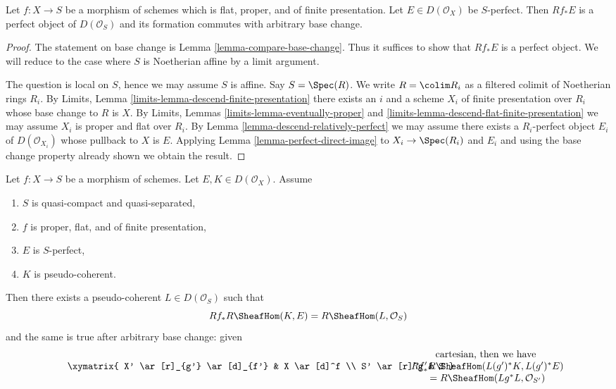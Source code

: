 \begin{lemma}
\label{lemma-derived-pushforward-rel-perfect}
Let $f : X \to S$ be a morphism of schemes which is flat, proper, and
of finite presentation. Let $E \in D(\mathcal{O}_X)$ be $S$-perfect.
Then $Rf_*E$ is a perfect object of $D(\mathcal{O}_S)$
and its formation commutes with arbitrary base change.
\end{lemma}

\begin{proof}
The statement on base change is Lemma \ref{lemma-compare-base-change}.
Thus it suffices to show that $Rf_*E$ is a perfect object. We will reduce
to the case where $S$ is Noetherian affine by a limit argument.

\medskip\noindent
The question is local on $S$, hence we may assume $S$ is affine.
Say $S = \Spec(R)$. We write $R = \colim R_i$ as a filtered colimit
of Noetherian rings $R_i$. By Limits, Lemma
\ref{limits-lemma-descend-finite-presentation}
there exists an $i$ and a scheme $X_i$ of finite presentation over $R_i$
whose base change to $R$ is $X$. By
Limits, Lemmas \ref{limits-lemma-eventually-proper} and
\ref{limits-lemma-descend-flat-finite-presentation}
we may assume $X_i$ is proper and flat over $R_i$.
By Lemma \ref{lemma-descend-relatively-perfect}
we may assume there exists a $R_i$-perfect object $E_i$ of
$D(\mathcal{O}_{X_i})$ whose pullback to $X$ is $E$.
Applying Lemma \ref{lemma-perfect-direct-image}
to $X_i \to \Spec(R_i)$ and $E_i$ and using the
base change property already shown we obtain the result.
\end{proof}

\begin{lemma}
\label{lemma-compute-ext-rel-perfect}
Let $f : X \to S$ be a morphism of schemes. Let $E, K \in D(\mathcal{O}_X)$.
Assume
\begin{enumerate}
\item $S$ is quasi-compact and quasi-separated,
\item $f$ is proper, flat, and of finite presentation,
\item $E$ is $S$-perfect,
\item $K$ is pseudo-coherent.
\end{enumerate}
Then there exists a pseudo-coherent $L \in D(\mathcal{O}_S)$ such that
$$
Rf_*R\SheafHom(K, E) = R\SheafHom(L, \mathcal{O}_S)
$$
and the same is true after arbitrary base change: given
$$
\vcenter{
\xymatrix{
X' \ar[r]_{g'} \ar[d]_{f'} &
X \ar[d]^f \\
S' \ar[r]^g &
S
}
}
\quad\quad
\begin{matrix}
\text{cartesian, then we have } \\
Rf'_*R\SheafHom(L(g')^*K, L(g')^*E) \\
= R\SheafHom(Lg^*L, \mathcal{O}_{S'})
\end{matrix}
$$
\end{lemma}

